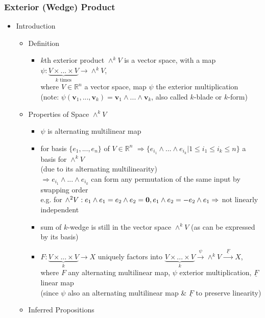 \subsubsection{Exterior (Wedge) Product}
\begin{itemize}
\item Introduction
	\begin{itemize}
	\item Definition
		\begin{itemize}
		\item $k$th exterior product $\wedge^kV$ is a vector space, with a map $\psi:\underbrace{V\times...\times V}_{k \text{ times}} \rightarrow \wedge^kV$, \\
		where $V\in \mathbb R^n$ a vector space, map $\psi$ the exterior multiplication \\ 
		(note: $\psi(\mathbf v_1,...,\mathbf v_k) = \mathbf v_1\wedge...\wedge\mathbf v_k$, also called $k$-blade or $k$-form)
		\end{itemize}
	\item Properties of Space $\wedge^kV$
		\begin{itemize}
		\item $\psi$ is alternating multilinear map
		\item for basis $\{e_1,...,e_n\}$ of $V\in\mathbb R^n$ $\Rightarrow \{e_{i_1}\wedge ...\wedge e_{i_k}|1\leq i_1 \leq i_k \leq n\}$ a basis for $\wedge^kV$ \\
		(due to its alternating multilinearity) \\
		$\Rightarrow e_{i_1}\wedge ...\wedge e_{i_k}$ can form any permutation of the same input by swapping order \\
		e.g. for $\wedge^2V: e_1\wedge e_1 = e_2\wedge e_2=\mathbf 0,\space e_1\wedge e_2=-e_2\wedge e_1 \Rightarrow$ not linearly independent
		\item sum of $k$-wedge is still in the vector space $\wedge^k V$ (as can be expressed by its basis)
		\item $F:\underbrace{V\times...\times V}_k\rightarrow X$ uniquely factors into $\underbrace{V\times...\times V}_k\xrightarrow{\psi} \wedge^k V \xrightarrow{\text{ }\underline F\text{ }} X$, \\ 
		where $F$ any alternating multilinear map, $\psi$ exterior multiplication, $\underline F$ linear map \\
		(since $\psi$ also an alternating multilinear map \& $\underline F$ to preserve linearity)
		\end{itemize}
	\item Inferred Propositions

\end{itemize}
\end{itemize}

